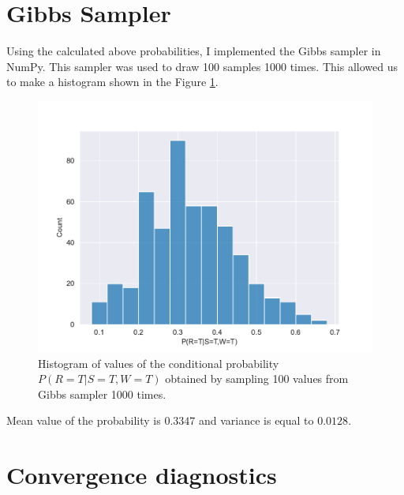 \documentclass[a4paper,11pt]{article}
\begin{document}
\section{Gibbs Sampler}
Using the calculated above probabilities, I implemented the Gibbs sampler in NumPy. This sampler was used to draw 100 samples 1000 times. This allowed us to make a histogram shown in the Figure \ref{fig1}.
\begin{figure}[H]
    \centering
    \includegraphics[scale = 0.86]{Plots/histogram100.pdf}
    \caption{Histogram of values of the conditional probability $P(R=T|S=T,W=T)$ obtained by sampling 100 values from Gibbs sampler 1000 times.}
    \label{fig1}
\end{figure}
\noindent Mean value of the probability is $ 0.3347$ and variance is equal to $0.0128$.
\section{Convergence diagnostics}
\end{document}
